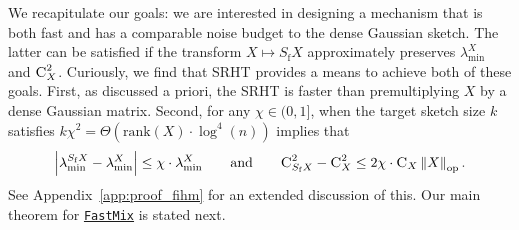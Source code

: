 \documentclass[11pt]{article}
\theoremstyle{definition}
\theoremstyle{plain}
\providecommand{\appendixref}[1]{Appendix~\ref{#1}}
\newcommand{\abs}[1]{\left| #1 \right|}
\newcommand{\Norm}[1]{\left\| #1 \right\|}
\providecommand{\norm}[1]{\Norm{#1}}
\newcommand{\FastMix}{\hyperref[alg:fast_mixing]{\texttt{FastMix}}\xspace}
\begin{document}
We recapitulate our goals: we are interested in designing a mechanism that is both fast and has a comparable noise budget to the dense Gaussian sketch.
The latter can be satisfied if the transform \(X \mapsto S_{\mathrm{f}}X\) approximately preserves \(\lambda_{\min}^{X}\) and \(\textsc{C}_{X}^{2}\).
Curiously, we find that SRHT provides a means to achieve both of these goals.
First, as discussed a priori, the SRHT is faster than premultiplying \(X\) by a dense Gaussian matrix.
Second, for any $\chi \in (0,1]$, when the target sketch size \(k\) satisfies $k\chi^2 = \Theta\left(\mathrm{rank}(X)\cdot\log^4(n)\right)$ implies that
\begin{equation*}
    \abs{\lambda_{\min}^{S_{\mathrm{f}}X} - \lambda^{X}_{\min}} \leq \chi\cdot \lambda_{\min}^{X} \qquad\text{and}\qquad \textsc{C}_{S_{\mathrm{f}}X}^2 - \textsc{C}_X^2 \leq 2\chi\cdot \textsc{C}_X\norm{X}_{\mathrm{op}}.
\end{equation*}
See \appendixref{app:proof_fihm} for an extended discussion of this.
Our main theorem for \FastMix is stated next.
\end{document}
